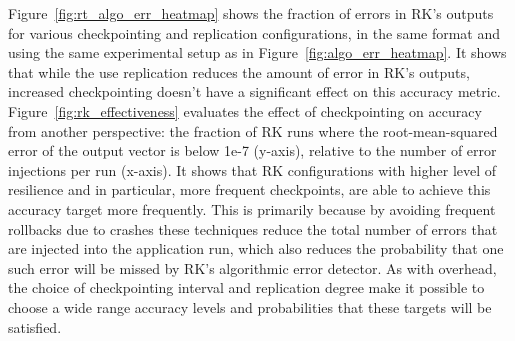 \documentclass{sig-alternate}
\begin{document}
{Figure~\ref{fig:rt_algo_err_heatmap} shows the fraction of errors in RK's outputs for various checkpointing and replication configurations, in the same format and using the same experimental setup as in Figure~\ref{fig:algo_err_heatmap}.
It shows that while the use replication reduces the amount of error in RK's outputs, increased checkpointing doesn't have a significant effect on this accuracy metric.
Figure~\ref{fig:rk_effectiveness} evaluates the effect of checkpointing on accuracy from another perspective: the fraction of RK runs where the root-mean-squared error of the output vector is below 1e-7 (y-axis), relative to the number of error injections per run (x-axis).
It shows that RK configurations with higher level of resilience and in particular, more frequent checkpoints, are able to achieve this accuracy target more frequently.
This is primarily because by avoiding frequent rollbacks due to crashes these techniques reduce the total number of errors that are injected into the application run, which also reduces the probability that one such error will be missed by RK's algorithmic error detector.
As with overhead, the choice of checkpointing interval and replication degree make it possible to choose a wide range accuracy levels and probabilities that these targets will be satisfied.

}
\end{document}
